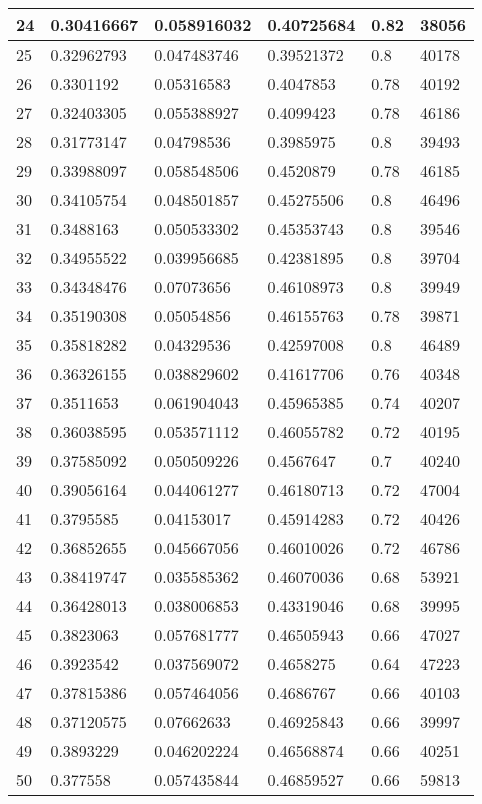 \begin{longtable}{|l|l|l|l|l|l|}
24 & 0.30416667 & 0.058916032 & 0.40725684 & 0.82 & 38056 \\ \hline 
25 & 0.32962793 & 0.047483746 & 0.39521372 & 0.8 & 40178 \\ \hline 
26 & 0.3301192 & 0.05316583 & 0.4047853 & 0.78 & 40192 \\ \hline 
27 & 0.32403305 & 0.055388927 & 0.4099423 & 0.78 & 46186 \\ \hline 
28 & 0.31773147 & 0.04798536 & 0.3985975 & 0.8 & 39493 \\ \hline 
29 & 0.33988097 & 0.058548506 & 0.4520879 & 0.78 & 46185 \\ \hline 
30 & 0.34105754 & 0.048501857 & 0.45275506 & 0.8 & 46496 \\ \hline 
31 & 0.3488163 & 0.050533302 & 0.45353743 & 0.8 & 39546 \\ \hline 
32 & 0.34955522 & 0.039956685 & 0.42381895 & 0.8 & 39704 \\ \hline 
33 & 0.34348476 & 0.07073656 & 0.46108973 & 0.8 & 39949 \\ \hline 
34 & 0.35190308 & 0.05054856 & 0.46155763 & 0.78 & 39871 \\ \hline 
35 & 0.35818282 & 0.04329536 & 0.42597008 & 0.8 & 46489 \\ \hline 
36 & 0.36326155 & 0.038829602 & 0.41617706 & 0.76 & 40348 \\ \hline 
37 & 0.3511653 & 0.061904043 & 0.45965385 & 0.74 & 40207 \\ \hline 
38 & 0.36038595 & 0.053571112 & 0.46055782 & 0.72 & 40195 \\ \hline 
39 & 0.37585092 & 0.050509226 & 0.4567647 & 0.7 & 40240 \\ \hline 
40 & 0.39056164 & 0.044061277 & 0.46180713 & 0.72 & 47004 \\ \hline 
41 & 0.3795585 & 0.04153017 & 0.45914283 & 0.72 & 40426 \\ \hline 
42 & 0.36852655 & 0.045667056 & 0.46010026 & 0.72 & 46786 \\ \hline 
43 & 0.38419747 & 0.035585362 & 0.46070036 & 0.68 & 53921 \\ \hline 
44 & 0.36428013 & 0.038006853 & 0.43319046 & 0.68 & 39995 \\ \hline 
45 & 0.3823063 & 0.057681777 & 0.46505943 & 0.66 & 47027 \\ \hline 
46 & 0.3923542 & 0.037569072 & 0.4658275 & 0.64 & 47223 \\ \hline 
47 & 0.37815386 & 0.057464056 & 0.4686767 & 0.66 & 40103 \\ \hline 
48 & 0.37120575 & 0.07662633 & 0.46925843 & 0.66 & 39997 \\ \hline 
49 & 0.3893229 & 0.046202224 & 0.46568874 & 0.66 & 40251 \\ \hline 
50 & 0.377558 & 0.057435844 & 0.46859527 & 0.66 & 59813 \\ \hline 
\end{longtable}